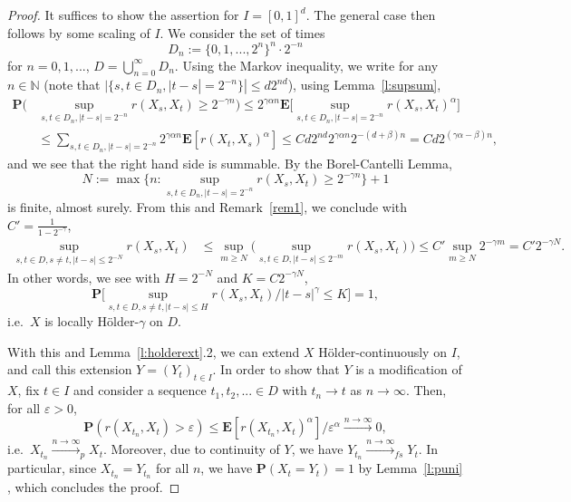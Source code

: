 \documentclass{article}
\theoremstyle{definition}
\theoremstyle{step} \newtheorem{step}{Step}
\begin{document}
\begin{proof}
  It suffices to show the assertion for $I=[0,1]^d$. The general case
  then follows by some scaling of $I$. We consider the set of times
  $$ D_n := \{0,1,...,2^n\}^n \cdot 2^{-n}$$ for $n=0,1,...$, $D
    =\bigcup_{n=0}^\infty D_n$. Using the Markov inequality, we write
  for any $n\in\mathbb N$ (note that $|\{s,t\in D_n, |t-s| = 2^{-n}\}|
    \leq d2^{nd}$), using Lemma~\ref{l:supsum},
  \begin{align*}
    \mathbf P\Big( & \sup_{s,t\in D_n, |t-s| = 2^{-n}} r(X_s, X_t)
    \geq 2^{-\gamma n} \Big) \leq 2^{\gamma \alpha n}\mathbf
    E\Big[\sup_{s,t\in D_n, |t-s| = 2^{-n}} r(X_s, X_t)^\alpha \Big]
    \\ & \leq \sum_{s,t\in D_n, |t-s| = 2^{-n}} 2^{\gamma\alpha
        n}\mathbf E[r(X_t,X_s)^\alpha] \leq Cd2^{nd} 2^{\gamma\alpha n}
    2^{-(d + \beta) n} = Cd 2^{(\gamma\alpha - \beta)n},
  \end{align*}
  and we see that the right hand side is summable. By the
  Borel-Cantelli Lemma,
  $$ N := \max \Big\{n: \sup_{s,t\in D_n, |t-s| = 2^{-n}} r(X_s, X_t)
    \geq 2^{-\gamma n}\Big\} + 1$$ is finite, almost surely. From this
  and Remark~\ref{rem1}, we conclude with $C' =
    \frac{1}{1-2^{-\gamma}}$,
  \begin{align*}
    \sup_{s,t\in D, s\neq t, |t-s| \leq 2^{-N}} r(X_s, X_t) & \leq
    \sup_{m \geq N} \Big( \sup_{s,t\in D, |t-s|\leq 2^{-m}} r(X_s,
    X_t)\Big) \leq C' \sup_{m \geq N} 2^{-\gamma m} = C' 2^{-\gamma
        N}.
  \end{align*}
  In other words, we see with $H = 2^{-N}$ and $K = C 2^{-\gamma N}$,
  $$ \mathbf P\Big[\sup_{s,t\in D, s\neq t, |t-s| \leq H} r(X_s,
      X_t)/|t-s|^\gamma \leq K\Big] = 1,
  $$
  i.e.\ $X$ is locally Hölder-$\gamma$ on $D$.

  With this and Lemma~\ref{l:holderext}.2, we can extend $X$
  Hölder-continuously on $I$, and call this extension $ Y =
    (Y_t)_{t\in I}$. In order to show that $Y$ is a modification of $X$,
  fix $t\in I$ and consider a sequence $t_1,t_2,...\in D$ with $t_n\to
    t$ as $n\to \infty$. Then, for all $\varepsilon>0$,
  $$\mathbf P(r(X_{t_n}, X_t) > \varepsilon) \leq \mathbf E[r(X_{t_n},
        X_t)^\alpha]/\varepsilon^\alpha \xrightarrow{n\to\infty} 0,$$
  i.e.\ $X_{t_n} \xrightarrow{n\to\infty}_p X_t$. Moreover, due to
  continuity of $Y$, we have $Y_{t_n} \xrightarrow{n\to\infty}_{fs}
    Y_t$. In particular, since $X_{t_n} = Y_{t_n}$ for all $n$, we have
  $\mathbf P(X_t= Y_t)=1$ by Lemma~\ref{l:puni} , which concludes the
  proof.
\end{proof}
\end{document}
